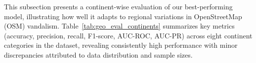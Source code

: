 \documentclass[
    13pt, %
    a4paper, %
    DIV14, %
    listof=totoc, %
    bibliography=totoc, %
    index=totoc, %
    headsepline
]{scrreprt}
\begin{document}
This subsection presents a continent-wise evaluation of our best-performing model, illustrating how well it adapts to regional variations in OpenStreetMap (OSM) vandalism. Table~\ref{tab:geo_eval_continents} summarizes key metrics (accuracy, precision, recall, F1-score, AUC-ROC, AUC-PR) across eight continent categories in the dataset, revealing consistently high performance with minor discrepancies attributed to data distribution and sample sizes.

\begin{table}[htbp]
    \centering
    \caption{Continent-Wise Metrics for the Best Model}
    \label{tab:geo_eval_metrics}
\end{table}
\end{document}
